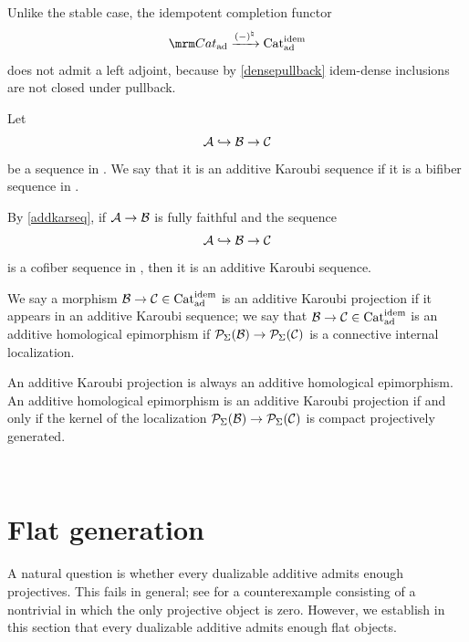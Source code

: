 \documentclass[a4paper,10pt, oneside]{amsart}
\begin{document}
\begin{rem}
	Unlike the stable case, the idempotent completion functor $$\Cat_{\op{ad}}\xrightarrow{(-)^{\natural}} \catadidem$$ does not admit a left adjoint, because by \cref{densepullback} idem-dense inclusions are not closed under pullback.
\end{rem}
\begin{de}
	Let $$\mathcal{A} \hookrightarrow\mathcal{B} \to \mathcal{C}$$ be a sequence in \catadidem. We say that it is an additive Karoubi sequence if it is a bifiber sequence in \catadidem.
\end{de}
\begin{rem}
	By \cref{addkarseq}, if $\mathcal{A} \to \mathcal{B}$ is fully faithful and the sequence $$\mathcal{A} \hookrightarrow\mathcal{B} \to \mathcal{C}$$ is a cofiber sequence in \catadidem, then it is an additive Karoubi sequence.
\end{rem}
	\begin{de}
		We say a morphism $\mathcal{B}\to\mathcal{C}\in \mathrm{Cat}_{\mathrm{ad}}^{\mathrm{idem}}$ is an additive Karoubi projection if it appears in an additive Karoubi sequence; we say that $\mathcal{B}\to\mathcal{C}\in \mathrm{Cat}_{\mathrm{ad}}^{\mathrm{idem}}$ is an additive homological epimorphism if $\mathcal{P}_{\Sigma}(\mathcal{B})\to\mathcal{P}_{\Sigma}(\mathcal{C})$ is a connective internal localization.
	\end{de}
	\begin{rem}
		An additive Karoubi projection is always an additive homological epimorphism. An additive homological epimorphism is
		an additive Karoubi projection if and only if the kernel of the localization $\mathcal{P}_{\Sigma}(\mathcal{B})\to\mathcal{P}_{\Sigma}(\mathcal{C})$ is compact projectively generated.
	\end{rem}
	

	

\begin{rem}\,

	
\end{rem}



	
	

	
\section{Flat generation}\label{section4}
A natural question is whether every dualizable additive \infcat admits enough projectives. This fails in general; see \cite[Example 3.1.24]{stefanich2023classification} for a counterexample consisting of a nontrivial \dualaddinfcat in which the only projective object is zero. However, we establish in this section that every dualizable additive \infcat admits enough flat objects.
\end{document}
